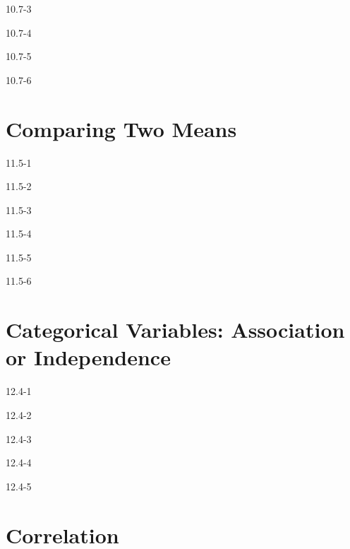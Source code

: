 \begin{exsol@solution}{10.7-3}
\end{exsol@solution}
\begin{exsol@solution}{10.7-4}
\end{exsol@solution}
\begin{exsol@solution}{10.7-5}
\end{exsol@solution}
\begin{exsol@solution}{10.7-6}
\end{exsol@solution}
\setcounter{chapter}{11}\chapter{Comparing Two Means}
\begin{exsol@solution}{11.5-1}

\end{exsol@solution}
\begin{exsol@solution}{11.5-2}
\end{exsol@solution}
\begin{exsol@solution}{11.5-3}
\end{exsol@solution}
\begin{exsol@solution}{11.5-4}

\end{exsol@solution}
\begin{exsol@solution}{11.5-5}
\end{exsol@solution}
\begin{exsol@solution}{11.5-6}
\end{exsol@solution}
\setcounter{chapter}{12}\chapter{Categorical Variables: Association or Independence}
\begin{exsol@solution}{12.4-1}
\end{exsol@solution}
\begin{exsol@solution}{12.4-2}
\end{exsol@solution}
\begin{exsol@solution}{12.4-3}
\end{exsol@solution}
\begin{exsol@solution}{12.4-4}
\end{exsol@solution}
\begin{exsol@solution}{12.4-5}
\end{exsol@solution}
\setcounter{chapter}{13}\chapter{Correlation}
